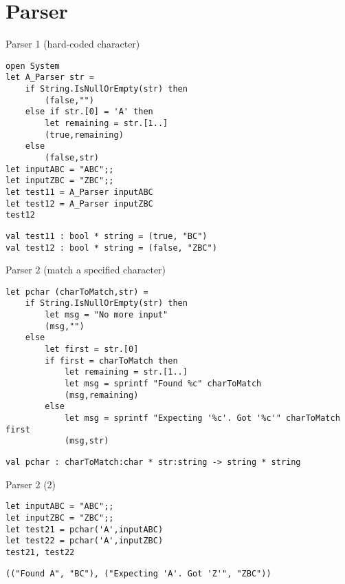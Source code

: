 \documentclass[t]{beamer}
\begin{document}
\section{Parser }
\label{sec:orgad1a2f4}
\begin{frame}[label={sec:orge368dad},fragile]{Parser 1 (hard-coded character)}
 \begin{verbatim}
open System
let A_Parser str =
    if String.IsNullOrEmpty(str) then
        (false,"")
    else if str.[0] = 'A' then
        let remaining = str.[1..]
        (true,remaining)
    else
        (false,str)
let inputABC = "ABC";;
let inputZBC = "ZBC";;
let test11 = A_Parser inputABC
let test12 = A_Parser inputZBC
test12
\end{verbatim}

\begin{verbatim}
val test11 : bool * string = (true, "BC")
val test12 : bool * string = (false, "ZBC")
\end{verbatim}
\end{frame}

\begin{frame}[label={sec:orgab22d6a},fragile]{Parser 2 (match a specified character)}
 \begin{verbatim}
let pchar (charToMatch,str) =
    if String.IsNullOrEmpty(str) then
        let msg = "No more input"
        (msg,"")
    else 
        let first = str.[0] 
        if first = charToMatch then
            let remaining = str.[1..]
            let msg = sprintf "Found %c" charToMatch
            (msg,remaining)
        else
            let msg = sprintf "Expecting '%c'. Got '%c'" charToMatch first
            (msg,str)
\end{verbatim}

\begin{verbatim}
val pchar : charToMatch:char * str:string -> string * string
\end{verbatim}
\end{frame}


\begin{frame}[label={sec:org7066d9d},fragile]{Parser 2 (2)}
 \begin{verbatim}
let inputABC = "ABC";;
let inputZBC = "ZBC";;
let test21 = pchar('A',inputABC) 
let test22 = pchar('A',inputZBC)
test21, test22
\end{verbatim}

\begin{verbatim}
(("Found A", "BC"), ("Expecting 'A'. Got 'Z'", "ZBC"))
\end{verbatim}
\end{frame}
\end{document}
